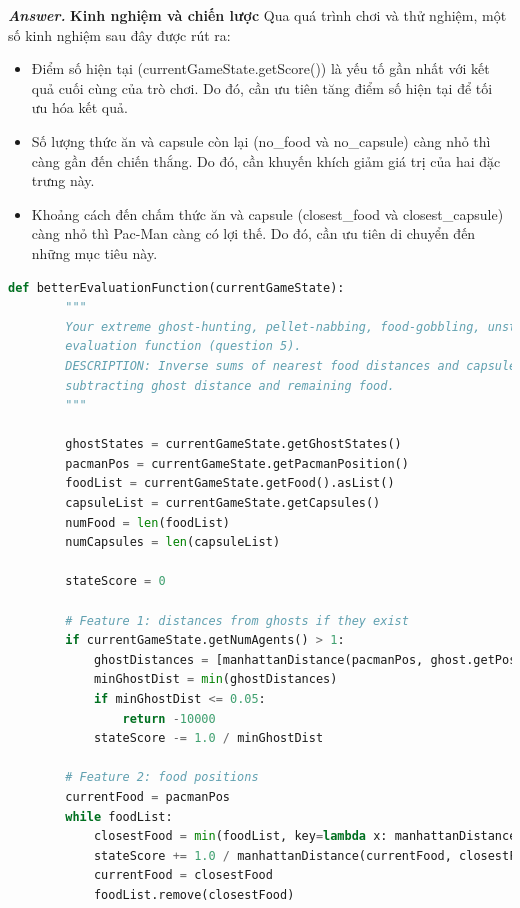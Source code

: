 \documentclass[12pt]{article}
\newenvironment{solution}[1][\it{Answer}]{\textbf{#1. } }{}
\begin{document}
\begin{solution}
\hspace{-1em}\textbf{Kinh nghiệm và chiến lược}
Qua quá trình chơi và thử nghiệm, một số kinh nghiệm sau đây được rút ra:
\begin{itemize}
    \item Điểm số hiện tại (currentGameState.getScore()) là yếu tố gần nhất với kết quả cuối cùng của trò chơi. Do đó, cần ưu tiên tăng điểm số hiện tại để tối ưu hóa kết quả.
    \item Số lượng thức ăn và capsule còn lại (no\_food và no\_capsule) càng nhỏ thì càng gần đến chiến thắng. Do đó, cần khuyến khích giảm giá trị của hai đặc trưng này.
    \item Khoảng cách đến chấm thức ăn và capsule (closest\_food và closest\_capsule) càng nhỏ thì Pac-Man càng có lợi thế. Do đó, cần ưu tiên di chuyển đến những mục tiêu này.
\end{itemize}


\lstset{style=mystyle}
\begin{tcolorbox}[boxrule=0.5pt, colback=white]
    \begin{lstlisting}[language=python, numbers=none, basicstyle=\ttfamily\footnotesize]
    def betterEvaluationFunction(currentGameState):
        """
        Your extreme ghost-hunting, pellet-nabbing, food-gobbling, unstoppable
        evaluation function (question 5).
        DESCRIPTION: Inverse sums of nearest food distances and capsule distances, adding game score,
        subtracting ghost distance and remaining food.
        """
    
        ghostStates = currentGameState.getGhostStates()
        pacmanPos = currentGameState.getPacmanPosition()
        foodList = currentGameState.getFood().asList()
        capsuleList = currentGameState.getCapsules()
        numFood = len(foodList)
        numCapsules = len(capsuleList)
    
        stateScore = 0
    
        # Feature 1: distances from ghosts if they exist
        if currentGameState.getNumAgents() > 1:
            ghostDistances = [manhattanDistance(pacmanPos, ghost.getPosition()) for ghost in ghostStates]
            minGhostDist = min(ghostDistances)
            if minGhostDist <= 0.05:
                return -10000
            stateScore -= 1.0 / minGhostDist
    
        # Feature 2: food positions
        currentFood = pacmanPos
        while foodList:
            closestFood = min(foodList, key=lambda x: manhattanDistance(x, currentFood))
            stateScore += 1.0 / manhattanDistance(currentFood, closestFood)
            currentFood = closestFood
            foodList.remove(closestFood)
    

\end{lstlisting}
\end{tcolorbox}
\end{solution}
\end{document}
